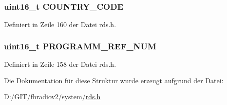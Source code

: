 \subsubsection[{C\+O\+U\+N\+T\+R\+Y\+\_\+\+C\+O\+D\+E}]{\setlength{\rightskip}{0pt plus 5cm}uint16\+\_\+t C\+O\+U\+N\+T\+R\+Y\+\_\+\+C\+O\+D\+E}\label{structpi_a104410f64e8aa7ab69f76a5ee53a0a8a}


Definiert in Zeile 160 der Datei rds.\+h.

\hypertarget{structpi_aa0995bba54da782b6ff03d66f16e3c57}{}
\subsubsection[{P\+R\+O\+G\+R\+A\+M\+M\+\_\+\+R\+E\+F\+\_\+\+N\+U\+M}]{\setlength{\rightskip}{0pt plus 5cm}uint16\+\_\+t P\+R\+O\+G\+R\+A\+M\+M\+\_\+\+R\+E\+F\+\_\+\+N\+U\+M}\label{structpi_aa0995bba54da782b6ff03d66f16e3c57}


Definiert in Zeile 158 der Datei rds.\+h.



Die Dokumentation für diese Struktur wurde erzeugt aufgrund der Datei\+:\begin{DoxyCompactItemize}
\item 
D\+:/\+G\+I\+T/fhradiov2/system/\hyperlink{rds_8h}{rds.\+h}\end{DoxyCompactItemize}
